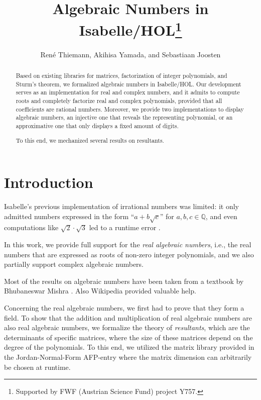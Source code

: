 \documentclass[11pt,a4paper]{article}
\newcommand\rats{\mathbb{Q}}
\newcommand\rais{real algebraic numbers\xspace}
\begin{document}
\title{Algebraic Numbers in Isabelle/HOL\footnote{Supported by FWF (Austrian Science Fund) project Y757.}}
\author{Ren\'e Thiemann, Akihisa Yamada, and Sebastiaan Joosten}
\maketitle

\begin{abstract}
Based on existing libraries for matrices, factorization of integer polynomials, 
and Sturm's theorem,
we formalized algebraic numbers in Isabelle/HOL. Our development serves
as an implementation for real and complex numbers, and it admits to compute roots
and completely factorize real and complex polynomials, provided that all
coefficients are rational numbers. Moreover, we provide two implementations to display
algebraic numbers, an injective one that reveals the representing polynomial, or an approximative one that only displays a fixed amount of digits.

To this end, we mechanized several results on resultants.
\end{abstract}

\tableofcontents

\section{Introduction}

Isabelle's previous implementation of irrational numbers was limited:
it only admitted numbers expressed in the form ``$a+b\sqrt{c}$'' for $a,b,c \in \rats$,
and even computations like $\sqrt2 \cdot \sqrt3$ led to a runtime error \cite{Real-AFP}.

In this work, we provide full support for the \emph{real algebraic numbers},
i.e., the real numbers that are expressed as roots of non-zero integer polynomials,
and we also partially support complex algebraic numbers.

Most of the results on algebraic numbers have been taken from a textbook 
by Bhubaneswar Mishra \cite{AlgNumbers}.
Also Wikipedia provided valuable help.

\medskip
Concerning the real algebraic numbers, we first had to prove that they form a field.
To show that the addition and multiplication of \rais are also \rais,
we formalize the theory of \emph{resultants}, which are the determinants of 
specific matrices, where the size of these matrices depend on the degree of the 
polynomials.
To this end, we utilized the matrix library provided in the Jordan-Normal-Form
AFP-entry \cite{JNF-AFP} where the matrix dimension can arbitrarily be chosen at runtime.
\end{document}
